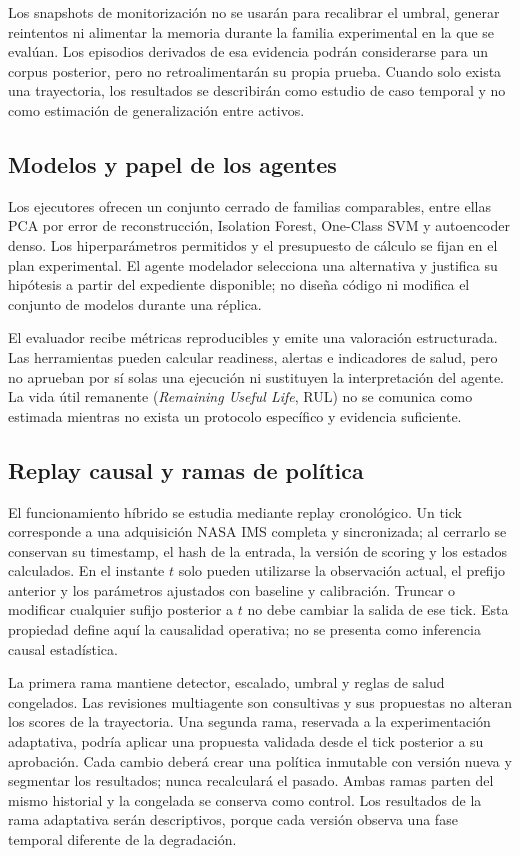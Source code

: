 Los snapshots de monitorización no se usarán para recalibrar el umbral, generar
reintentos ni alimentar la memoria durante la familia experimental en la que se
evalúan. Los episodios derivados de esa evidencia podrán considerarse para un
corpus posterior, pero no retroalimentarán su propia prueba. Cuando solo exista
una trayectoria, los resultados se describirán como estudio de caso temporal y
no como estimación de generalización entre activos.

\subsection{Modelos y papel de los agentes}

Los ejecutores ofrecen un conjunto cerrado de familias comparables, entre ellas
PCA por error de reconstrucción, Isolation Forest, One-Class SVM y autoencoder
denso. Los hiperparámetros permitidos y el presupuesto de cálculo se fijan en el
plan experimental. El agente modelador selecciona una alternativa y justifica
su hipótesis a partir del expediente disponible; no diseña código ni modifica
el conjunto de modelos durante una réplica.

El evaluador recibe métricas reproducibles y emite una valoración estructurada.
Las herramientas pueden calcular readiness, alertas e indicadores de salud,
pero no aprueban por sí solas una ejecución ni sustituyen la interpretación del
agente. La vida útil remanente (\textit{Remaining Useful Life}, RUL) no se
comunica como estimada mientras no exista un protocolo específico y evidencia
suficiente.

\subsection{Replay causal y ramas de política}

El funcionamiento híbrido se estudia mediante replay cronológico. Un tick
corresponde a una adquisición NASA IMS completa y sincronizada; al cerrarlo se
conservan su timestamp, el hash de la entrada, la versión de scoring y los
estados calculados. En el instante $t$ solo pueden utilizarse la observación
actual, el prefijo anterior y los parámetros ajustados con baseline y
calibración. Truncar o modificar cualquier sufijo posterior a $t$ no debe
cambiar la salida de ese tick. Esta propiedad define aquí la causalidad
operativa; no se presenta como inferencia causal estadística.

La primera rama mantiene detector, escalado, umbral y reglas de salud
congelados. Las revisiones multiagente son consultivas y sus propuestas no
alteran los scores de la trayectoria. Una segunda rama, reservada a la
experimentación adaptativa, podría aplicar una propuesta validada desde el tick
posterior a su aprobación. Cada cambio deberá crear una política inmutable con
versión nueva y segmentar los resultados; nunca recalculará el pasado. Ambas
ramas parten del mismo historial y la congelada se conserva como control. Los
resultados de la rama adaptativa serán descriptivos, porque cada versión observa
una fase temporal diferente de la degradación.

